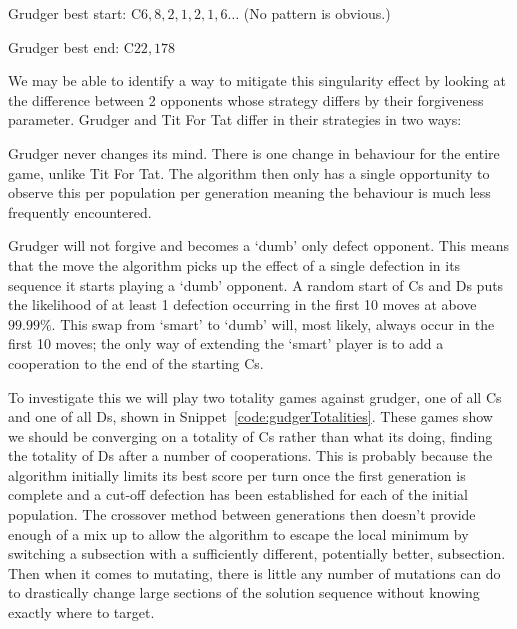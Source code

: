Grudger best start: C$6,8,2,1,2,1,6\ldots$ (No pattern is obvious.)

Grudger best end: C$22,178$

We may be able to identify a way to mitigate this singularity effect by looking at the difference between 2 opponents whose strategy differs by their forgiveness parameter.
Grudger and Tit For Tat differ in their strategies in two ways:
\begin{itemize}
    \begin{item}
        Grudger never changes its mind.
        There is one change in behaviour for the entire game, unlike Tit For Tat.
        The algorithm then only has a single opportunity to observe this per population per generation meaning the behaviour is much less frequently encountered.
    \end{item}
    \begin{item}
        Grudger will not forgive and becomes a `dumb' only defect opponent.
        This means that the move the algorithm picks up the effect of a single defection in its sequence it starts playing a `dumb' opponent.
        A random start of Cs and Ds puts the likelihood of at least 1 defection occurring in the first 10 moves at above \(99.99\% \).
        This swap from `smart' to `dumb' will, most likely, always occur in the first 10 moves;
        the only way of extending the `smart' player is to add a cooperation to the end of the starting Cs.
    \end{item}
\end{itemize}

To investigate this we will play two totality games against grudger, one of all Cs and one of all Ds, shown in Snippet~\ref{code:gudgerTotalities}. 
These games show we should be converging on a totality of Cs rather than what its doing, finding the totality of Ds after a number of cooperations.
This is probably because the algorithm initially limits its best score per turn once the first generation is complete and a cut-off defection has been established for each of the initial population.
The crossover method between generations then doesn't provide enough of a mix up to allow the algorithm to escape the local minimum by switching a subsection with a sufficiently different, potentially better, subsection.
Then when it comes to mutating, there is little any number of mutations can do to drastically change large sections of the solution sequence without knowing exactly where to target.


